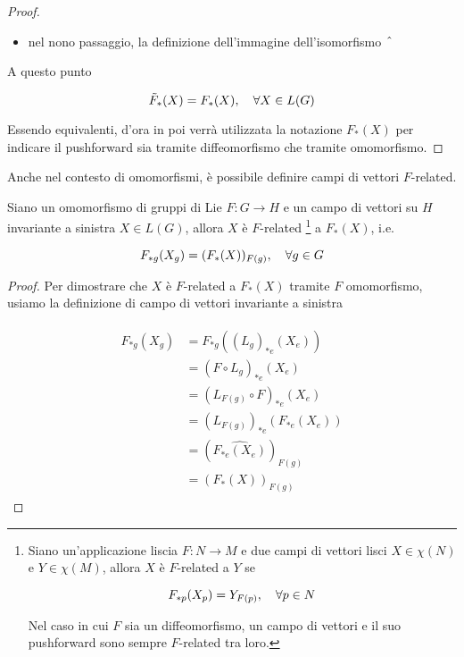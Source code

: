 \begin{proof}
\begin{itemize}
		\item nel nono passaggio, la definizione dell'immagine dell'isomorfismo $ \; \hat{} \; $
	\end{itemize}

	A questo punto
	
	\begin{equation}
		\tilde{F}_{*}(X) = F_{*}(X) \qcomma \forall X \in L(G)
	\end{equation}

	Essendo equivalenti, d'ora in poi verrà utilizzata la notazione $ F_{*}(X) $ per indicare il pushforward sia tramite diffeomorfismo che tramite omomorfismo.
\end{proof}

Anche nel contesto di omomorfismi, è possibile definire campi di vettori $ F $-related.

\begin{definition}
	Siano un omomorfismo di gruppi di Lie $ F : G \to H $ e un campo di vettori su $ H $ invariante a sinistra $ X \in L(G) $, allora $ X $ è $ F $-related \footnote{%
		Siano un'applicazione liscia $ F : N \to M $ e due campi di vettori lisci $ X \in \chi(N) $ e $ Y \in \chi(M) $, allora $ X $ è $ F $-related a $ Y $ se
		
		\begin{equation*}
			F_{*p} (X_{p}) = Y_{F(p)} \qcomma \forall p \in N
		\end{equation*}
	
		Nel caso in cui $ F $ sia un diffeomorfismo, un campo di vettori e il suo pushforward sono sempre $ F $-related tra loro.%
	} a $ F_{*}(X) $, i.e.

	\begin{equation}
		F_{*g} (X_{g}) = (F_{*}(X))_{F(g)} \qcomma \forall g \in G
	\end{equation}
\end{definition}

\begin{proof}
	Per dimostrare che $ X $ è $ F $-related a $ F_{*}(X) $ tramite $ F $ omomorfismo, usiamo la definizione di campo di vettori invariante a sinistra
	
	\begin{align}
		\begin{split}
			F_{*g} (X_{g}) &= F_{*g} ((L_{g})_{*e}(X_{e})) \\
			&= (F \circ L_{g})_{*e} (X_{e}) \\
			&= (L_{F(g)} \circ F)_{*e} (X_{e}) \\
			&= (L_{F(g)})_{*e} (F_{*e}(X_{e})) \\
			&= (\widehat{ F_{*e}(X_{e}) })_{F(g)} \\
			&= (F_{*}(X))_{F(g)}
		\end{split}
	\end{align}
\end{proof}

